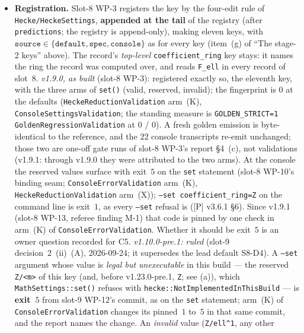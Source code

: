 \documentclass[11pt]{article}
\theoremstyle{remark}
\begin{document}
\begin{itemize}
  value is its one spelling above; it is what \texttt{text(key)} returns, what the settings block
  carries under \texttt{value}, and what enters the fingerprint, as
  \texttt{coefficient\_ring=Z/ell\textasciicircum<k>}.
\item \textbf{Registration.} Slot-8 WP-3 registers the key by the four-edit rule of
  \texttt{Hecke/HeckeSettings}, \textbf{appended at the tail} of the registry (after
  \texttt{predictions}; the registry is append-only), making eleven keys, with
  $\texttt{source}\in\{\texttt{default},\texttt{spec},\texttt{console}\}$ as for every key
  (item~(g) of ``The stage-2 keys'' above). The record's \emph{top-level}
  \texttt{coefficient\_ring} key stays: it names the ring the record was computed over, and reads
  \texttt{F\_ell} in every record of slot~8. \emph{v1.9.0, as built} (slot-8 WP-3): registered
  exactly so, the eleventh key, with the three arms of \texttt{set()} (valid, reserved, invalid);
  the fingerprint is $0$ at the defaults (\texttt{HeckeReductionValidation} arm~(K),
  \texttt{ConsoleSettingsValidation}; the standing measure is
  \texttt{GOLDEN\_STRICT=1 GoldenRegressionValidation} at $0$ / $0$). A fresh golden emission is
  byte-identical to the reference, and the $22$ console transcripts re-emit unchanged; those two
  are one-off gate runs of slot-8 WP-3's report \S4~(c), not validations (v1.9.1: through v1.9.0
  they were attributed to the two arms). At the console the reserved values surface with
  exit~$5$ on the \texttt{set} statement (slot-8 WP-10's binding seam; \texttt{ConsoleErrorValidation}
  arm~(K), \texttt{HeckeReductionValidation} arm~(X)); \texttt{--set coefficient\_ring=Z} on the
  command line is exit~$1$, as every \texttt{--set} refusal is ([P] v3.6.1 \S6). Since v1.9.1
  (slot-8 WP-13, referee finding M-1) that code is pinned by one check in arm~(K) of
  \texttt{ConsoleErrorValidation}. Whether it should be exit~$5$ is an owner question recorded
  for C5. \emph{v1.10.0-pre.1: ruled} (slot-9 decision~2~(ii)~(A), 2026-09-24; it supersedes the
  lead default S8-D4). A \texttt{--set} argument whose value is \emph{legal but unexecutable} in
  this build --- the reserved \texttt{Z/<m>} of this key (and, before v1.23.0-pre.1, \texttt{Z}; see (a)), which
  \texttt{MathSettings::set()} refuses with \texttt{hecke::NotImplementedInThisBuild} --- is
  \textbf{exit~$5$} from slot-9 WP-12's commit, as on the \texttt{set} statement; arm~(K) of
  \texttt{ConsoleErrorValidation} changes its pinned~$1$ to~$5$ in that same commit, and the
  report names the change. An \emph{invalid} value (\texttt{Z/ell\textasciicircum1}, any other

\end{itemize}
\end{document}
